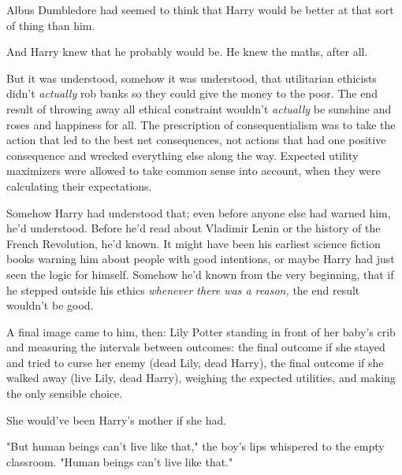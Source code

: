 Albus Dumbledore had seemed to think that Harry would be better at that sort of
thing than him.

And Harry knew that he probably would be. He knew the maths, after all.

But it was understood, somehow it was understood, that utilitarian ethicists
didn’t \emph{actually} rob banks so they could give the money to the poor. The
end result of throwing away all ethical constraint wouldn’t \emph{actually} be
sunshine and roses and happiness for all. The prescription of consequentialism
was to take the action that led to the best net consequences, not actions that
had one positive consequence and wrecked everything else along the way.
Expected utility maximizers were allowed to take common sense into account,
when they were calculating their expectations.

Somehow Harry had understood that; even before anyone else had warned him, he’d
understood. Before he’d read about Vladimir Lenin or the history of the French
Revolution, he’d known. It might have been his earliest science fiction books
warning him about people with good intentions, or maybe Harry had just seen the
logic for himself. Somehow he’d known from the very beginning, that if he
stepped outside his ethics \emph{whenever there was a reason,} the end result
wouldn’t be good.

A final image came to him, then: Lily Potter standing in front of her baby’s
crib and measuring the intervals between outcomes: the final outcome if she
stayed and tried to curse her enemy (dead Lily, dead Harry), the final outcome
if she walked away (live Lily, dead Harry), weighing the expected utilities,
and making the only sensible choice.

She would’ve been Harry’s mother if she had.

"But human beings can’t live like that," the boy’s lips whispered to the empty
classroom. "Human beings can’t live like that."
